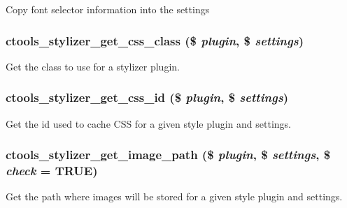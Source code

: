\label{includes_2stylizer_8inc_a82a6b3afe1fbd52197afa3dceb692d78}
Copy font selector information into the settings \hypertarget{includes_2stylizer_8inc_a4c5d78d1561824bb9c1a6ca84fe79368}{
\subsubsection[{ctools\_\-stylizer\_\-get\_\-css\_\-class}]{\setlength{\rightskip}{0pt plus 5cm}ctools\_\-stylizer\_\-get\_\-css\_\-class (\$ {\em plugin}, \/  \$ {\em settings})}}
\label{includes_2stylizer_8inc_a4c5d78d1561824bb9c1a6ca84fe79368}
Get the class to use for a stylizer plugin. \hypertarget{includes_2stylizer_8inc_acacf8de6ab55ca1c52fd88b9aef8559b}{
\subsubsection[{ctools\_\-stylizer\_\-get\_\-css\_\-id}]{\setlength{\rightskip}{0pt plus 5cm}ctools\_\-stylizer\_\-get\_\-css\_\-id (\$ {\em plugin}, \/  \$ {\em settings})}}
\label{includes_2stylizer_8inc_acacf8de6ab55ca1c52fd88b9aef8559b}
Get the id used to cache CSS for a given style plugin and settings. \hypertarget{includes_2stylizer_8inc_ae48648f40a99667c1b8bbfda187f69fb}{
\subsubsection[{ctools\_\-stylizer\_\-get\_\-image\_\-path}]{\setlength{\rightskip}{0pt plus 5cm}ctools\_\-stylizer\_\-get\_\-image\_\-path (\$ {\em plugin}, \/  \$ {\em settings}, \/  \$ {\em check} = {\ttfamily TRUE})}}
\label{includes_2stylizer_8inc_ae48648f40a99667c1b8bbfda187f69fb}
Get the path where images will be stored for a given style plugin and settings.

